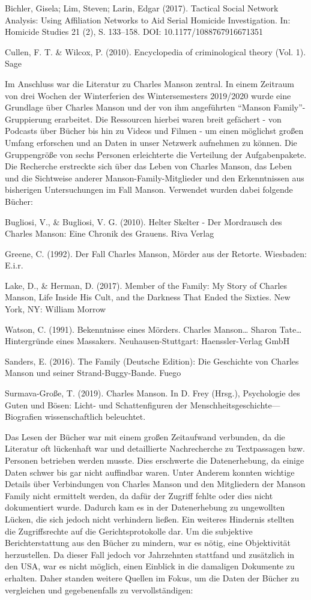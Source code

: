 \documentclass[
]{article}
\begin{document}
Bichler, Gisela; Lim, Steven; Larin, Edgar (2017). Tactical Social
Network Analysis: Using Affiliation Networks to Aid Serial Homicide
Investigation. In: Homicide Studies 21 (2), S. 133--158. DOI:
10.1177/1088767916671351

Cullen, F. T. \& Wilcox, P. (2010). Encyclopedia of criminological
theory (Vol. 1). Sage

Im Anschluss war die Literatur zu Charles Manson zentral. In einem
Zeitraum von drei Wochen der Winterferien des Wintersemesters 2019/2020
wurde eine Grundlage über Charles Manson und der von ihm angeführten
``Manson Family''-Gruppierung erarbeitet. Die Ressourcen hierbei waren
breit gefächert - von Podcasts über Bücher bis hin zu Videos und Filmen
- um einen möglichst großen Umfang erforschen und an Daten in unser
Netzwerk aufnehmen zu können. Die Gruppengröße von sechs Personen
erleichterte die Verteilung der Aufgabenpakete. Die Recherche erstreckte
sich über das Leben von Charles Manson, das Leben und die Sichtweise
anderer Manson-Family-Mitglieder und den Erkenntnissen aus bisherigen
Untersuchungen im Fall Manson. Verwendet wurden dabei folgende Bücher:

Bugliosi, V., \& Bugliosi, V. G. (2010). Helter Skelter - Der Mordrausch
des Charles Manson: Eine Chronik des Grauens. Riva Verlag

Greene, C. (1992). Der Fall Charles Manson, Mörder aus der Retorte.
Wiesbaden: E.i.r.

Lake, D., \& Herman, D. (2017). Member of the Family: My Story of
Charles Manson, Life Inside His Cult, and the Darkness That Ended the
Sixties. New York, NY: William Morrow

Watson, C. (1991). Bekenntnisse eines Mörders. Charles Manson\ldots{}
Sharon Tate\ldots Hintergründe eines Massakers. Neuhausen-Stuttgart:
Haenssler-Verlag GmbH

Sanders, E. (2016). The Family (Deutsche Edition): Die Geschichte von
Charles Manson und seiner Strand-Buggy-Bande. Fuego

Surmava-Große, T. (2019). Charles Manson. In D. Frey (Hrsg.),
Psychologie des Guten und Bösen: Licht- und Schattenfiguren der
Menschheitsgeschichte---Biografien wissenschaftlich beleuchtet.

Das Lesen der Bücher war mit einem großen Zeitaufwand verbunden, da die
Literatur oft lückenhaft war und detaillierte Nachrecherche zu
Textpassagen bzw. Personen betrieben werden musste. Dies erschwerte die
Datenerhebung, da einige Daten schwer bis gar nicht auffindbar waren.
Unter Anderem konnten wichtige Details über Verbindungen von Charles
Manson und den Mitgliedern der Manson Family nicht ermittelt werden, da
dafür der Zugriff fehlte oder dies nicht dokumentiert wurde. Dadurch kam
es in der Datenerhebung zu ungewollten Lücken, die sich jedoch nicht
verhindern ließen. Ein weiteres Hindernis stellten die Zugriffsrechte
auf die Gerichtsprotokolle dar. Um die subjektive Berichterstattung aus
den Bücher zu mindern, war es nötig, eine Objektivität herzustellen. Da
dieser Fall jedoch vor Jahrzehnten stattfand und zusätzlich in den USA,
war es nicht möglich, einen Einblick in die damaligen Dokumente zu
erhalten. Daher standen weitere Quellen im Fokus, um die Daten der
Bücher zu vergleichen und gegebenenfalls zu vervollständigen:
\end{document}
